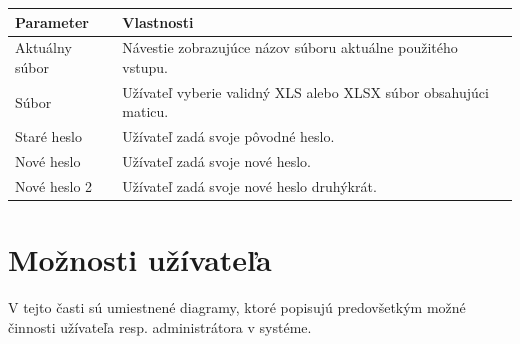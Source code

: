 \documentclass[12pt,a4paper]{report}
\begin{document}
\begin{table}[h!]
	\centering
	\begin{tabular}{|>{\centering\arraybackslash}m{3in}|>{\centering\arraybackslash}m{3in}|}
		\hline
		\centering Parameter & Vlastnosti \\ [0ex]
		\hline
		Aktuálny súbor & Návestie zobrazujúce názov súboru aktuálne použitého vstupu.\\ [0ex]
		\hline
		Súbor & Užívateľ  vyberie  validný XLS alebo XLSX súbor obsahujúci maticu. \\ [0ex]
		\hline
		Staré heslo & Užívateľ zadá svoje pôvodné heslo.\\ [0ex]	
		\hline
		Nové heslo & Užívateľ zadá svoje nové heslo. \\ [0ex]		
		\hline
		Nové heslo 2 & Užívateľ zadá svoje nové heslo druhýkrát. \\ [0ex]		
		\hline
	\end{tabular}
\end{table}
\FloatBarrier
\pagebreak
\section[Možnosti užívateľa]{\rmfamily\bfseries
	Možnosti užívateľa}

	V tejto časti sú umiestnené diagramy, ktoré popisujú predovšetkým možné činnosti užívateľa resp. administrátora v systéme.
\end{document}
